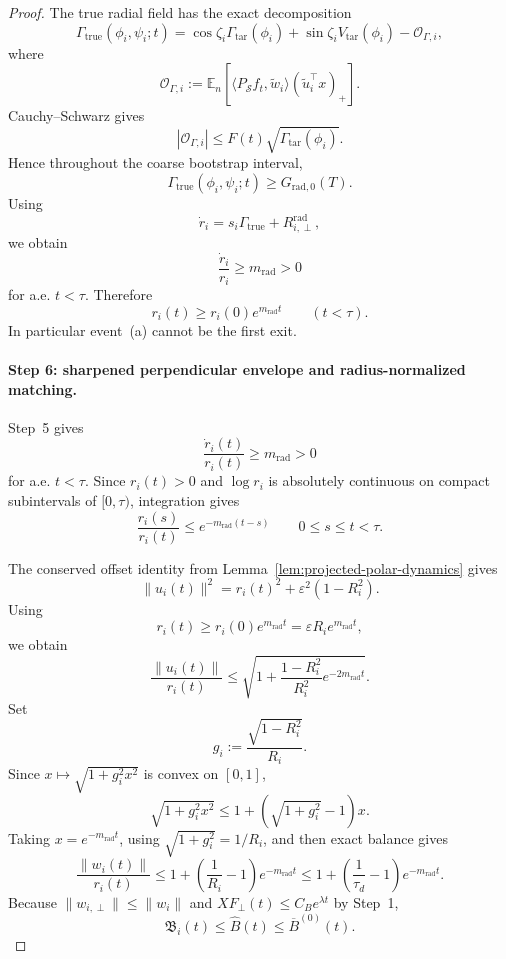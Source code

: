 \documentclass{article} %
\theoremstyle{plain}
\theoremstyle{definition}
\theoremstyle{remark}
\begin{document}
\begin{proof}
The true radial field has the exact decomposition
\[
\boxed{
\Gamma_{\mathrm{true}}(\phi_i,\psi_i;t)
=
\cos\zeta_i\Gamma_{\mathrm{tar}}(\phi_i)
+
\sin\zeta_iV_{\mathrm{tar}}(\phi_i)
-
\mathcal O_{\Gamma,i},
}
\]
where
\[
\mathcal O_{\Gamma,i}
:=
\mathbb E_n
\left[
\langle P_{\mathcal S}f_t,\widetilde w_i\rangle
(\widetilde u_i^\top x)_+
\right].
\]
Cauchy--Schwarz gives
\[
|\mathcal O_{\Gamma,i}|
\le
F(t)\sqrt{\Gamma_{\mathrm{tar}}(\phi_i)}.
\]
Hence throughout the coarse bootstrap interval,
\[
\Gamma_{\mathrm{true}}(\phi_i,\psi_i;t)
\ge
G_{\mathrm{rad},0}(T).
\]
Using
\[
\dot r_i
=
s_i\Gamma_{\mathrm{true}}
+
R_{i,\perp}^{\mathrm{rad}},
\]
we obtain
\[
\frac{\dot r_i}{r_i}
\ge
m_{\mathrm{rad}}
>
0
\]
for a.e. $t<\tau$.  Therefore
\[
\boxed{
r_i(t)
\ge
r_i(0)e^{m_{\mathrm{rad}}t}
}
\qquad
(t<\tau).
\]
In particular event~\textnormal{(a)} cannot be the first exit.

\paragraph{Step 6: sharpened perpendicular envelope and radius-normalized
matching.}

Step~5 gives
\[
\frac{\dot r_i(t)}{r_i(t)}
\ge
m_{\mathrm{rad}}>0
\]
for a.e. $t<\tau$.  Since $r_i(t)>0$ and $\log r_i$ is absolutely
continuous on compact subintervals of $[0,\tau)$, integration gives
\[
\boxed{
\frac{r_i(s)}{r_i(t)}
\le
e^{-m_{\mathrm{rad}}(t-s)}
}
\qquad
0\le s\le t<\tau.
\]

The conserved offset identity from
Lemma~\ref{lem:projected-polar-dynamics} gives
\[
\|u_i(t)\|^2
=
r_i(t)^2+\varepsilon^2(1-R_i^2).
\]
Using
\[
r_i(t)
\ge
r_i(0)e^{m_{\mathrm{rad}}t}
=
\varepsilon R_i e^{m_{\mathrm{rad}}t},
\]
we obtain
\[
\frac{\|u_i(t)\|}{r_i(t)}
\le
\sqrt{
1+
\frac{1-R_i^2}{R_i^2}
e^{-2m_{\mathrm{rad}}t}
}.
\]
Set
\[
g_i:=\frac{\sqrt{1-R_i^2}}{R_i}.
\]
Since $x\mapsto\sqrt{1+g_i^2x^2}$ is convex on $[0,1]$,
\[
\sqrt{1+g_i^2x^2}
\le
1+
\left(\sqrt{1+g_i^2}-1\right)x.
\]
Taking $x=e^{-m_{\mathrm{rad}}t}$, using
$\sqrt{1+g_i^2}=1/R_i$, and then exact balance gives
\[
\boxed{
\frac{\|w_i(t)\|}{r_i(t)}
\le
1+
\left(\frac1{R_i}-1\right)e^{-m_{\mathrm{rad}}t}
\le
1+
\left(\frac1{\tau_d}-1\right)e^{-m_{\mathrm{rad}}t}.
}
\]
Because $\|w_{i,\perp}\|\le\|w_i\|$ and
$XF_\perp(t)\le C_Be^{\lambda t}$ by Step~1,
\[
\boxed{
\mathfrak B_i(t)
\le
\widehat B(t)
\le
\overline B^{(0)}(t).
}
\]


\end{proof}
\end{document}
